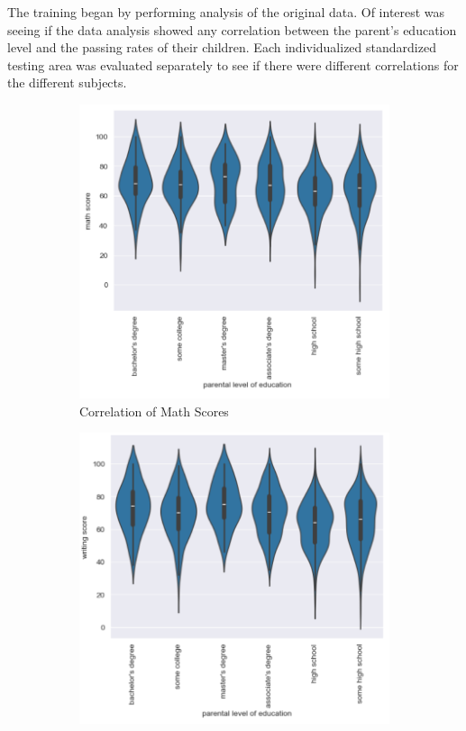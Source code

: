 \documentclass[doc]{apa6} %
\begin{document}
The training began by performing analysis of the original data. Of interest was seeing if the data analysis showed any correlation between the parent's education level and the passing rates of their children. Each individualized standardized testing area was evaluated separately to see if there were different correlations for the different subjects. 

\begin{figure}[H]
    \centering
    \caption{Correlations of Parent Education to Student Scores}
    \begin{subfigure}[b]{0.28\textwidth}
    \includegraphics[width=\linewidth]{MathVsParent.png}
    \caption{Correlation of Math Scores}
    \label{fig:math1}
    \end{subfigure}
    \begin{subfigure}[b]{0.28\textwidth}
    \includegraphics[width=\linewidth]{WritingVsParent.png}

\end{subfigure}
\end{figure}
\end{document}
